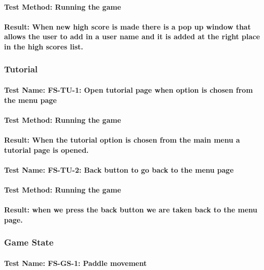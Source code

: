 \documentclass[12pt, titlepage]{article}
\begin{document}
\paragraph {Test Method: Running the game}
\paragraph {Result: When new high score is made there is a pop up window that allows the user to add in a user name and it is added at the right place in the high scores list.}
 
\subsubsection {Tutorial} 
\paragraph {Test Name: FS-TU-1: Open tutorial page when option is chosen from the menu page}
\paragraph {Test Method: Running the game}
\paragraph {Result:  When the tutorial option is chosen from the main menu a tutorial page is opened. }

\paragraph {Test Name: FS-TU-2: Back button to go back to the menu page}
\paragraph {Test Method: Running the game}
\paragraph {Result: when we press the back button we are taken back to the menu page.}

\subsubsection { Game State}
\paragraph {Test Name: FS-GS-1: Paddle movement}
\end{document}
